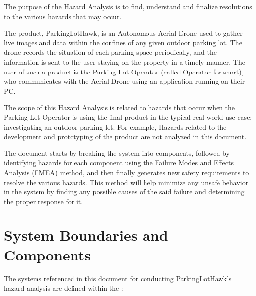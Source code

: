 \documentclass{article}
\begin{document}
The purpose of the Hazard Analysis is to find, understand and finalize resolutions to the various hazards that may occur.  

The product, ParkingLotHawk, is an Autonomous Aerial Drone used to gather live images and data within the confines of any given outdoor parking lot. The drone records the situation of each parking space periodically, and the information is sent to the user staying on the property in a timely manner. The user of such a product is the Parking Lot Operator (called Operator for short), who communicates with the Aerial Drone using an application running on their PC.

The scope of this Hazard Analysis is related to hazards that occur when the Parking Lot Operator is using the final product in the typical real-world use case: investigating an outdoor parking lot. For example, Hazards related to the development and prototyping of the product are not analyzed in this document. 

The document starts by breaking the system into components, followed by identifying hazards for each component using the Failure Modes and Effects Analysis (FMEA) method, and then finally generates new safety requirements to resolve the various hazards. This method will help minimize any unsafe behavior in the system by finding any possible causes of the said failure and determining the proper response for it.

\section{System Boundaries and Components}
\label{SystemBoundaries}
The systems referenced in this document for conducting ParkingLotHawk’s hazard analysis are defined within the :
\end{document}
